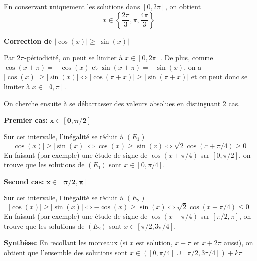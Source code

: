 \documentclass[a4paper,12pt]{article}
\begin{document}
En conservant uniquement les solutions dans $[0, 2\pi]$, on obtient
\[
x \in \left\{ \frac{2\pi}{3}, \pi, \frac{4\pi}{3} \right\}
\]

\textbf{Correction de $|\cos(x)| \geq |\sin(x)|$}

Par $2\pi$-périodicité, on peut se limiter à $x \in [0,2\pi]$. De plus, comme $\cos(x + \pi) = -\cos(x)$ et $\sin(x + \pi) = -\sin(x)$, on a $|\cos(x)| \geq |\sin(x)| \Leftrightarrow |\cos(\pi + x)| \geq |\sin(\pi + x)|$ et on peut donc se limiter à $x \in [0, \pi]$.

On cherche ensuite à se débarrasser des valeurs absolues en distinguant 2 cas.

\textbf{Premier cas:} $\mathbf{x \in [0, \pi/2]}$

Sur cet intervalle, l'inégalité se réduit à $(E_1)$
\[
|\cos(x)| \geq |\sin(x)| \Leftrightarrow \cos(x) \geq \sin(x) \Leftrightarrow \sqrt{2}\cos(x + \pi/4) \geq 0
\]
En faisant (par exemple) une étude de signe de $\cos(x + \pi/4)$ sur $[0, \pi/2]$, on trouve que les solutions de $(E_1)$ sont $x \in [0, \pi/4]$.

\textbf{Second cas:} $\mathbf{x \in [\pi/2, \pi]}$

Sur cet intervalle, l'inégalité se réduit à $(E_2)$
\[
|\cos(x)| \geq |\sin(x)| \Leftrightarrow -\cos(x) \geq \sin(x) \Leftrightarrow \sqrt{2}\cos(x - \pi/4) \leq 0
\]
En faisant (par exemple) une étude de signe de $\cos(x - \pi/4)$ sur $[\pi/2, \pi]$, on trouve que les solutions de $(E_2)$ sont $x \in [\pi/2, 3\pi/4]$.

\textbf{Synthèse:}
En recollant les morceaux (si $x$ est solution, $x+\pi$ et $x+2\pi$ aussi), on obtient que l'ensemble des solutions sont $x\in ([0, \pi/4] \cup [\pi/2, 3\pi/4]) + k\pi$
\end{document}
